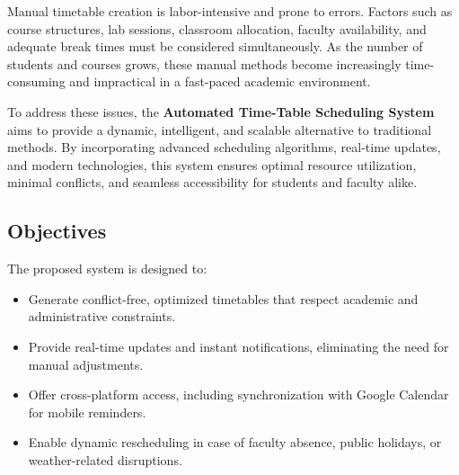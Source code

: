 \documentclass[12pt]{article}
\begin{document}
Manual timetable creation is labor-intensive and prone to errors. Factors such as course structures, lab sessions, classroom allocation, faculty availability, and adequate break times must be considered simultaneously. As the number of students and courses grows, these manual methods become increasingly time-consuming and impractical in a fast-paced academic environment.

To address these issues, the \textbf{Automated Time-Table Scheduling System} aims to provide a dynamic, intelligent, and scalable alternative to traditional methods. By incorporating advanced scheduling algorithms, real-time updates, and modern technologies, this system ensures optimal resource utilization, minimal conflicts, and seamless accessibility for students and faculty alike.

\subsection{Objectives}
The proposed system is designed to:
\begin{itemize}
    \item Generate conflict-free, optimized timetables that respect academic and administrative constraints.
    \item Provide real-time updates and instant notifications, eliminating the need for manual adjustments.
    \item Offer cross-platform access, including synchronization with Google Calendar for mobile reminders.
    \item Enable dynamic rescheduling in case of faculty absence, public holidays, or weather-related disruptions.
\end{itemize}
\end{document}
